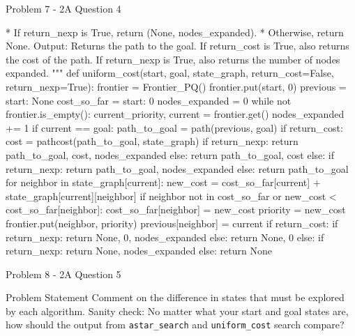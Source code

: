 \begin{problem}{Problem 7 - 2A Question 4}
\begin{highlight}[Solution]
\begin{code}[Python]
                    * If return_nexp is True, return (None, nodes_expanded).
                    * Otherwise, return None.
        Output:
            Returns the path to the goal.
            If return_cost is True, also returns the cost of the path.
            If return_nexp is True, also returns the number of nodes expanded.
    """
    def uniform_cost(start, goal, state_graph, return_cost=False, return_nexp=True):
        frontier = Frontier_PQ()
        frontier.put(start, 0)
        previous = {start: None}
        cost_so_far = {start: 0}
        nodes_expanded = 0
        while not frontier.is_empty():
            current_priority, current = frontier.get()
            nodes_expanded += 1
            if current == goal:
                path_to_goal = path(previous, goal)
                if return_cost:
                    cost = pathcost(path_to_goal, state_graph)
                    if return_nexp:
                        return path_to_goal, cost, nodes_expanded
                    else:
                        return path_to_goal, cost
                else:
                    if return_nexp:
                        return path_to_goal, nodes_expanded
                    else:
                        return path_to_goal
            for neighbor in state_graph[current]:
                new_cost = cost_so_far[current] + state_graph[current][neighbor]
                if neighbor not in cost_so_far or new_cost < cost_so_far[neighbor]:
                    cost_so_far[neighbor] = new_cost
                    priority = new_cost
                    frontier.put(neighbor, priority)
                    previous[neighbor] = current
        if return_cost:
            if return_nexp:
                return None, 0, nodes_expanded
            else:
                return None, 0
        else:
            if return_nexp:
                return None, nodes_expanded
            else:
                return None
    \end{code}
    \end{highlight}
\end{problem}

\begin{problem}{Problem 8 - 2A Question 5}
    \begin{statement}{Problem Statement}
        Comment on the difference in states that must be explored by each algorithm. Sanity check: No matter what your start and goal states are, how should the output from \texttt{astar\_search} 
        and \texttt{uniform\_cost} search compare?
    \end{statement}

    \begin{highlight}[Solution]
        
    \end{highlight}
\end{problem}


